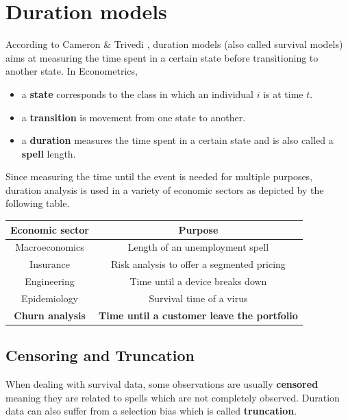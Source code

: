 \documentclass[
]{book}
\providecommand{\tightlist}{%
  \setlength{\itemsep}{0pt}\setlength{\parskip}{0pt}}
\begin{document}
\hypertarget{duration-models}{%
\section{Duration models}\label{duration-models}}

According to Cameron \& Trivedi \citep{CAMERON_TRIVEDI}, duration models (also called survival models) aims at measuring the time spent in a certain state before transitioning to another state. In Econometrics,

\begin{itemize}
\tightlist
\item
  a \textbf{state} corresponds to the class in which an individual \(i\) is at time \(t\).
\item
  a \textbf{transition} is movement from one state to another.
\item
  a \textbf{duration} measures the time spent in a certain state and is also called a \textbf{spell} length.
\end{itemize}

Since measuring the time until the event is needed for multiple purposes, duration analysis is used in a variety of economic sectors as depicted by the following table.

\begin{longtable}[]{@{}cc@{}}
\toprule
Economic sector & Purpose \\
\midrule
\endhead
Macroeconomics & Length of an unemployment spell \\
Insurance & Risk analysis to offer a segmented pricing \\
Engineering & Time until a device breaks down \\
Epidemiology & Survival time of a virus \\
\textbf{Churn analysis} & \textbf{Time until a customer leave the portfolio} \\
\bottomrule
\end{longtable}

\hypertarget{censoring-and-truncation}{%
\subsection{Censoring and Truncation}\label{censoring-and-truncation}}

When dealing with survival data, some observations are usually \textbf{censored} meaning they are related to spells which are not completely observed. Duration data can also suffer from a selection bias which is called \textbf{truncation}.
\end{document}
